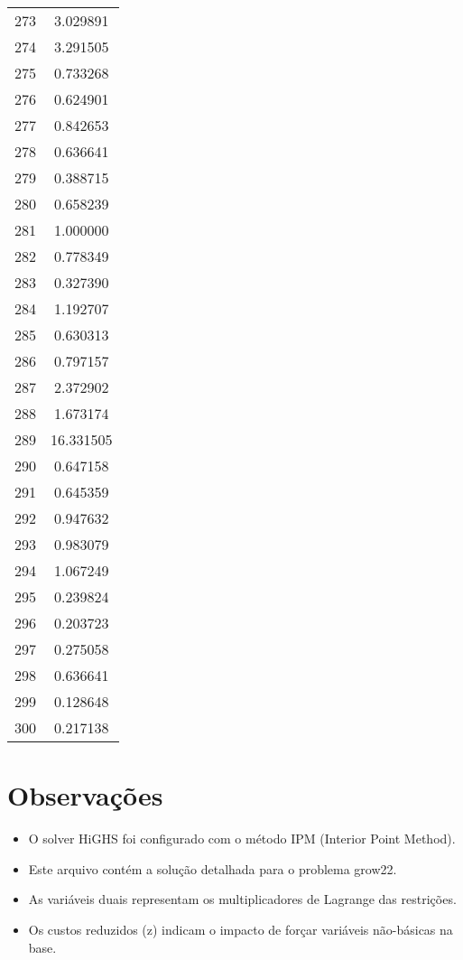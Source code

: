 \documentclass[12pt]{article}
\begin{document}
\begin{longtable}{@{}cc@{}}
273 & 3.029891 \\
274 & 3.291505 \\
275 & 0.733268 \\
276 & 0.624901 \\
277 & 0.842653 \\
278 & 0.636641 \\
279 & 0.388715 \\
280 & 0.658239 \\
281 & 1.000000 \\
282 & 0.778349 \\
283 & 0.327390 \\
284 & 1.192707 \\
285 & 0.630313 \\
286 & 0.797157 \\
287 & 2.372902 \\
288 & 1.673174 \\
289 & 16.331505 \\
290 & 0.647158 \\
291 & 0.645359 \\
292 & 0.947632 \\
293 & 0.983079 \\
294 & 1.067249 \\
295 & 0.239824 \\
296 & 0.203723 \\
297 & 0.275058 \\
298 & 0.636641 \\
299 & 0.128648 \\
300 & 0.217138 \\

\end{longtable}


\section{Observações}

\begin{itemize}
\item O solver HiGHS foi configurado com o método IPM (Interior Point Method).
\item Este arquivo contém a solução detalhada para o problema grow22.
\item As variáveis duais representam os multiplicadores de Lagrange das restrições.
\item Os custos reduzidos (z) indicam o impacto de forçar variáveis não-básicas na base.
\end{itemize}
\end{document}
